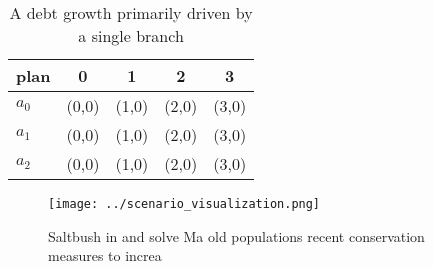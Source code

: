 \documentclass[a4paper]{article}
\begin{document}
\begin{table}
\begin{adjustbox}{width=0.5\columnwidth}
\begin{tabular}{|l|l|l|l|l|}
\hline
\textbf{plan} & \multicolumn{1}{c|}{\textbf{0}} & \multicolumn{1}{c|}{\textbf{1}} & \multicolumn{1}{c|}{\textbf{2}} & \multicolumn{1}{c|}{\textbf{3}} \\ \hline
\textbf{$a_0$}  & (0,0) & (1,0) & (2,0) & (3,0) \\ \hline
\textbf{$a_1$}  & (0,0) & (1,0) & (2,0) & (3,0) \\ \hline
\textbf{$a_2$}  & (0,0) & (1,0) & (2,0) & (3,0) \\ \hline
\end{tabular}
\end{adjustbox}
\caption{A debt growth primarily driven by a single branch
}
\end{table}

\begin{figure}
\centering
\texttt{[image: ../scenario\_visualization.png]}
\caption{Saltbush in and solve Ma old populations recent conservation measures to increa
}
\end{figure}
 
\end{document}
